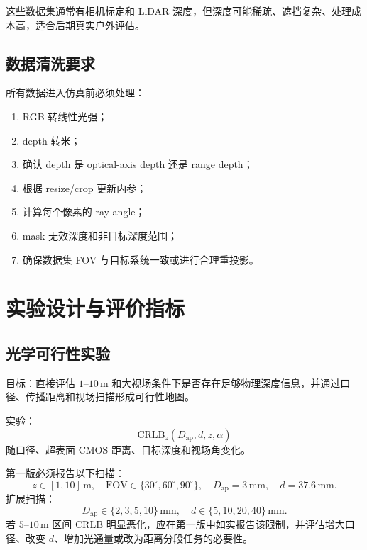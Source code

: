 \documentclass[11pt,a4paper,fontset=none]{ctexart}
\begin{document}
这些数据集通常有相机标定和 LiDAR 深度，但深度可能稀疏、遮挡复杂、处理成本高，适合后期真实户外评估。

\subsection{数据清洗要求}

所有数据进入仿真前必须处理：
\begin{enumerate}
  \item RGB 转线性光强；
  \item depth 转米；
  \item 确认 depth 是 optical-axis depth 还是 range depth；
  \item 根据 resize/crop 更新内参；
  \item 计算每个像素的 ray angle；
  \item mask 无效深度和非目标深度范围；
  \item 确保数据集 FOV 与目标系统一致或进行合理重投影。
\end{enumerate}

\section{实验设计与评价指标}

\subsection{光学可行性实验}

目标：直接评估 $1$--$10\,\mathrm{m}$ 和大视场条件下是否存在足够物理深度信息，并通过口径、传播距离和视场扫描形成可行性地图。

实验：
\begin{equation}
  \mathrm{CRLB}_z(D_{\mathrm{ap}},d,z,\alpha)
\end{equation}
随口径、超表面-CMOS 距离、目标深度和视场角变化。

第一版必须报告以下扫描：
\begin{equation}
  z\in[1,10]\,\mathrm{m},
  \quad
  \mathrm{FOV}\in\{30^\circ,60^\circ,90^\circ\},
  \quad
  D_{\mathrm{ap}}=3\,\mathrm{mm},
  \quad
  d=37.6\,\mathrm{mm}.
\end{equation}
扩展扫描：
\begin{equation}
  D_{\mathrm{ap}}\in\{2,3,5,10\}\,\mathrm{mm},
  \quad
  d\in\{5,10,20,40\}\,\mathrm{mm}.
\end{equation}
若 $5$--$10\,\mathrm{m}$ 区间 CRLB 明显恶化，应在第一版中如实报告该限制，并评估增大口径、改变 $d$、增加光通量或改为距离分段任务的必要性。
\end{document}
